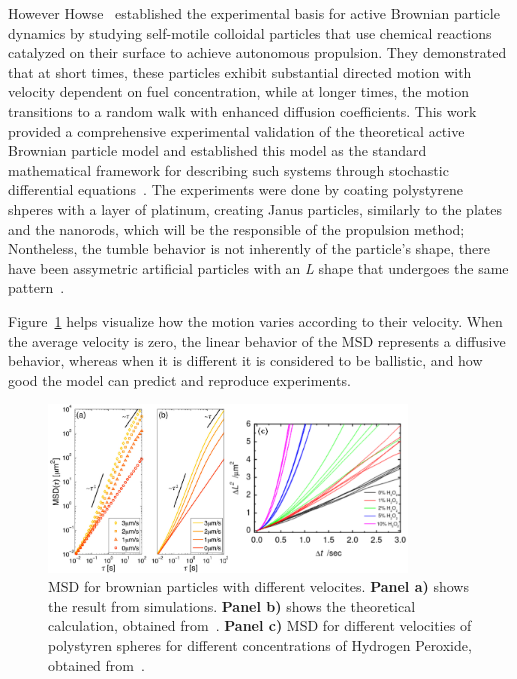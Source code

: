 However Howse~\cite{howse2007self} established the experimental basis for active Brownian particle dynamics by studying self-motile colloidal particles that use chemical reactions catalyzed on their surface to achieve autonomous propulsion. They demonstrated that at short times, these particles exhibit substantial directed motion with velocity dependent on fuel concentration, while at longer times, the motion transitions to a random walk with enhanced diffusion coefficients. This work provided a comprehensive experimental validation of the theoretical active Brownian particle model and established this model as the standard mathematical framework for describing such systems through stochastic differential equations~\cite{palacci2010sedimentation}. The experiments were done by coating polystyrene shperes with a layer of platinum, creating Janus particles, similarly to the plates and the nanorods, which will be the responsible of the propulsion method; Nontheless, the tumble behavior is not inherently of the particle's shape, there have been assymetric artificial particles with an \textit{L} shape that undergoes the same pattern~\cite{kummel2013circular}.

Figure~\ref{fig:msddifferentvelocities} helps visualize how  the motion varies according to their velocity. When the average velocity is zero, the linear behavior of the MSD represents a diffusive behavior, whereas when it is different it is considered to be ballistic, and how good the model can predict and reproduce experiments. 

\begin{figure}[h]
  \begin{center}
    \includegraphics[width=0.85\textwidth]{figures/msdmicroscopicagents.pdf}
  \end{center}
  \caption[MSD for brownian particles]{MSD for brownian particles with different velocites. \textbf{Panel a)} shows the result from simulations. \textbf{Panel b)} shows the theoretical calculation, obtained from~\cite{volpe2014simulation}. \textbf{Panel c)} MSD for different velocities of polystyren spheres for different concentrations of Hydrogen Peroxide, obtained from~\cite{howse2007self}.}\label{fig:msddifferentvelocities}
\end{figure}

